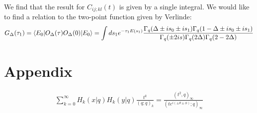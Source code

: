 \documentclass{scrarticle}
\begin{document}
We find that the result for $C_{ij;kl}(t)$ is given by a single integral. We would like to find a relation to the two-point function given by Verlinde:
\begin{equation}
    G_\Delta(\tau_1)=\braket{E_0|O_\Delta(\tau)O_\Delta(0)|E_0}=\int ds_1e^{-\tau_1E(s_1)}\frac{\Gamma_q(\Delta\pm is_0\pm is_1)\Gamma_q(1-\Delta\pm is_0\pm is_1)}{\Gamma_q(\pm 2is)\Gamma_q(2\Delta)\Gamma_q(2-2\Delta)}
\end{equation}
\section*{Appendix}

\begin{align}
    \sum_{k=0}^{\infty} H_k(x|q) H_k(y|q) \frac{t^k}{(q;q)_k} = \frac{(t^2, q)_\infty}{(t e^{i(\pm \theta \pm \phi)}; q)_\infty}
    \label{eq:generating_funct}
\end{align}

\newpage
\printbibliography
\end{document}
